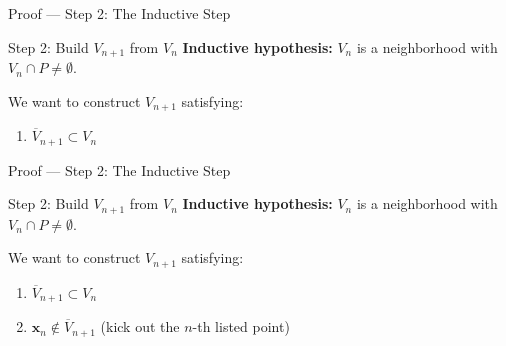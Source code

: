 \documentclass[aspectratio=169,12pt,t]{beamer}
\begin{document}
{%

\begin{frame}{Proof --- Step 2: The Inductive Step}
  \begin{proofblock}{Step 2: Build $V_{n+1}$ from $V_n$}
    \textbf{Inductive hypothesis:} $V_n$ is a neighborhood with $V_n \cap P \neq \emptyset$.
  \end{proofblock}

  \vspace{0.6em}
  \begin{hlbox}
    We want to construct $V_{n+1}$ satisfying:
    \begin{enumerate}
      \item[(i)] $\overline{V}_{n+1} \subset V_n$
    \end{enumerate}
  \end{hlbox}

\end{frame}

\begin{frame}{Proof --- Step 2: The Inductive Step}
  \begin{proofblock}{Step 2: Build $V_{n+1}$ from $V_n$}
    \textbf{Inductive hypothesis:} $V_n$ is a neighborhood with $V_n \cap P \neq \emptyset$.
  \end{proofblock}

  \vspace{0.6em}
  \begin{hlbox}
    We want to construct $V_{n+1}$ satisfying:
    \begin{enumerate}
      \item[(i)] $\overline{V}_{n+1} \subset V_n$
      \item[(ii)] $\mathbf{x}_n \notin \overline{V}_{n+1}$ \quad \alert{(kick out the $n$-th listed point)}
    \end{enumerate}
  \end{hlbox}


\end{frame}}
\end{document}
